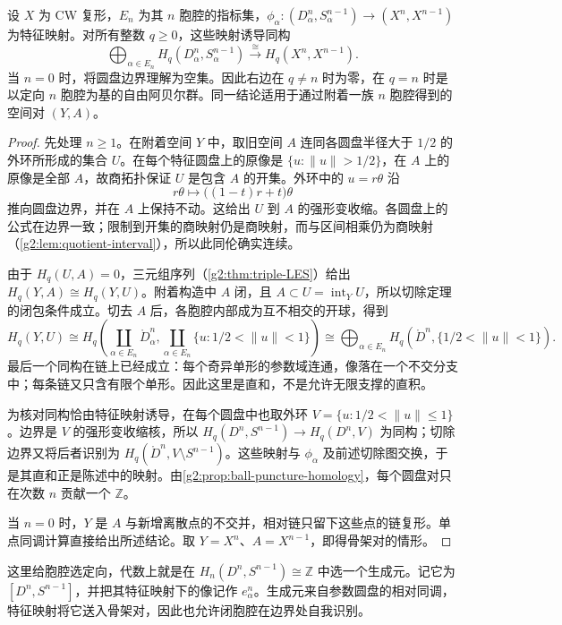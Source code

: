 \begin{theorem}\label{g2:thm:skeletal-relative-homology}
	设 \(X\) 为 CW 复形，\(E_n\) 为其 \(n\) 胞腔的指标集，\(\phi_\alpha:(D^n_\alpha,S^{n-1}_\alpha)\to(X^n,X^{n-1})\) 为特征映射。对所有整数 \(q\ge0\)，这些映射诱导同构
	\[
		\bigoplus_{\alpha\in E_n}H_q(D^n_\alpha,S^{n-1}_\alpha)
		\xrightarrow{\ \cong\ }H_q(X^n,X^{n-1}).
	\]
	当 \(n=0\) 时，将圆盘边界理解为空集。因此右边在 \(q\ne n\) 时为零，在 \(q=n\) 时是以定向 \(n\) 胞腔为基的自由阿贝尔群。同一结论适用于通过附着一族 \(n\) 胞腔得到的空间对 \((Y,A)\)。
\end{theorem}
\begin{proof}
	先处理 \(n\ge1\)。在附着空间 \(Y\) 中，取旧空间 \(A\) 连同各圆盘半径大于 \(1/2\) 的外环所形成的集合 \(U\)。在每个特征圆盘上的原像是 \(\{u:\|u\|>1/2\}\)，在 \(A\) 上的原像是全部 \(A\)，故商拓扑保证 \(U\) 是包含 \(A\) 的开集。外环中的 \(u=r\theta\) 沿
	\[
		r\theta\longmapsto\bigl((1-t)r+t\bigr)\theta
	\]
	推向圆盘边界，并在 \(A\) 上保持不动。这给出 \(U\) 到 \(A\) 的强形变收缩。各圆盘上的公式在边界一致；限制到开集的商映射仍是商映射，而与区间相乘仍为商映射（\cref{g2:lem:quotient-interval}），所以此同伦确实连续。

	由于 \(H_q(U,A)=0\)，三元组序列（\cref{g2:thm:triple-LES}）给出 \(H_q(Y,A)\cong H_q(Y,U)\)。附着构造中 \(A\) 闭，且 \(A\subset U=\operatorname{int}_Y U\)，所以切除定理的闭包条件成立。切去 \(A\) 后，各胞腔内部成为互不相交的开球，得到
	\[
		H_q(Y,U)\cong
		H_q\left(\coprod_{\alpha\in E_n}\mathring D^n_\alpha,
		\coprod_{\alpha\in E_n}\{u:1/2<\|u\|<1\}\right)
		\cong\bigoplus_{\alpha\in E_n}H_q(\mathring D^n,\{1/2<\|u\|<1\}).
	\]
	最后一个同构在链上已经成立：每个奇异单形的参数域连通，像落在一个不交分支中；每条链又只含有限个单形。因此这里是直和，不是允许无限支撑的直积。

	为核对同构恰由特征映射诱导，在每个圆盘中也取外环 \(V=\{u:1/2<\|u\|\le1\}\)。边界是 \(V\) 的强形变收缩核，所以 \(H_q(D^n,S^{n-1})\to H_q(D^n,V)\) 为同构；切除边界又将后者识别为 \(H_q(\mathring D^n,V\setminus S^{n-1})\)。这些映射与 \(\phi_\alpha\) 及前述切除图交换，于是其直和正是陈述中的映射。由\cref{g2:prop:ball-puncture-homology}，每个圆盘对只在次数 \(n\) 贡献一个 \(\mathbb Z\)。

	当 \(n=0\) 时，\(Y\) 是 \(A\) 与新增离散点的不交并，相对链只留下这些点的链复形。单点同调计算直接给出所述结论。取 \(Y=X^n\)、\(A=X^{n-1}\)，即得骨架对的情形。
\end{proof}

这里给胞腔选定向，代数上就是在 \(H_n(D^n,S^{n-1})\cong\mathbb Z\) 中选一个生成元。记它为 \([D^n,S^{n-1}]\)，并把其特征映射下的像记作 \(e^n_\alpha\)。生成元来自参数圆盘的相对同调，特征映射将它送入骨架对，因此也允许闭胞腔在边界处自我识别。

